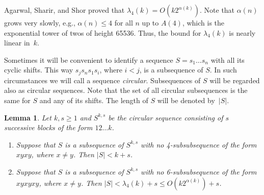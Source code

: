 \documentclass[reqno,12pt]{amsart}
\newtheorem{lemma}[theorem]{Lemma}
\newenvironment{bfenumerate}{\renewcommand{\labelenumi}{{\bf\theenumi.}}\renewcommand{\labelenumii}{{\bf(\theenumii)}}\begin{enumerate}}{\end{enumerate}}
\begin{document}
Agarwal, Sharir, and Shor \cite{ASS} proved that $\lambda_4(k)=O(k2^{\alpha(k)})$.
Note that $\alpha(n)$ grows very slowly, e.g., $\alpha(n)\le4$ for
all $n$ up to $A(4)$, which is the exponential tower of twos of height 65536. 
Thus, the bound for $\lambda_4(k)$ is nearly linear in~$k$.

Sometimes it will be convenient to identify a sequence $S=s_1\ldots s_n$ with all 
its cyclic shifts. This way $s_js_ns_1s_i$, where $i<j$,
is a subsequence of $S$. In such circumstances
we will call a sequence \emph{circular}.
Subsequences of $S$ will be
regarded also as circular sequences. Note that the set of all circular
subsequences is the same for $S$ and any of its shifts.
The length of $S$ will be denoted by~$|S|$.


\begin{lemma}\label{lem:circle}
Let $k,s\ge1$ and $S^{k,s}$ be the circular sequence consisting of $s$ successive
blocks of the form $12\ldots k$. 
\begin{bfenumerate}
\item
Suppose that $S$ is a subsequence of $S^{k,s}$ with no
4-subsubsequence of the form $xyxy$, where $x\ne y$. Then $|S|<k+s$.
\item
Suppose that $S$ is a subsequence of $S^{k,s}$ with no
6-subsubsequence of the form $xyxyxy$, where $x\ne y$. Then 
$|S|<\lambda_4(k)+s\le O(k2^{\alpha(k)})+s$.
\end{bfenumerate}
\end{lemma}
\end{document}

